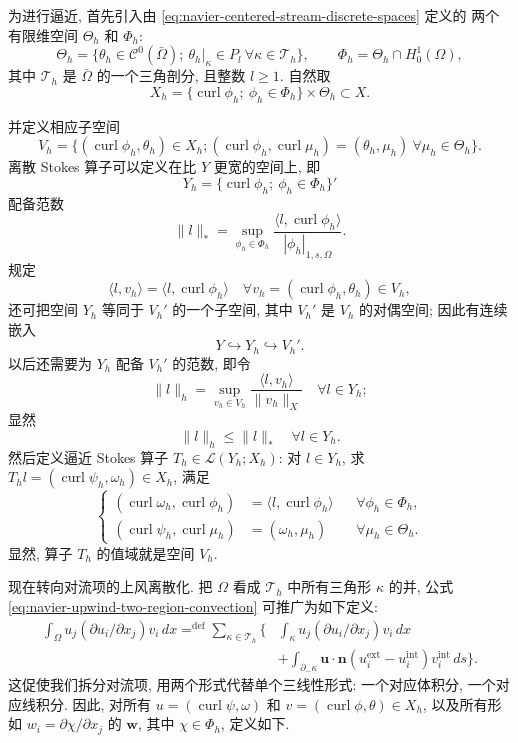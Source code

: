 为进行逼近, 首先引入由 \eqref{eq:navier-centered-stream-discrete-spaces} 定义的
两个有限维空间 $\Theta_h$ 和 $\Phi_h$:
\[
\Theta_h=\{\theta_h\in\mathcal C^0(\bar\Omega);
\ \theta_h|_\kappa\in P_l\ \forall\kappa\in\mathcal T_h\},
\qquad
\Phi_h=\Theta_h\cap H_0^1(\Omega),
\]
其中 $\mathcal T_h$ 是 $\bar\Omega$ 的一个三角剖分, 且整数 $l\geq1$. 自然取
\[
X_h=\{\operatorname{curl}\phi_h;\ \phi_h\in\Phi_h\}\times\Theta_h\subset X.
\]

并定义相应子空间
\begin{equation}\label{eq:navier-upwind-discrete-subspace}
V_h=\{(\operatorname{curl}\phi_h,\theta_h)\in X_h;
(\operatorname{curl}\phi_h,\operatorname{curl}\mu_h)
=(\theta_h,\mu_h)\ \forall\mu_h\in\Theta_h\}.
\end{equation}
离散 Stokes 算子可以定义在比 $Y$ 更宽的空间上, 即
\[
Y_h=\{\operatorname{curl}\phi_h;\ \phi_h\in\Phi_h\}'
\]
配备范数
\[
\|l\|_*=\sup_{\phi_h\in\Phi_h}
\frac{\langle l,\operatorname{curl}\phi_h\rangle}{|\phi_h|_{1,s,\Omega}}.
\]
规定
\[
\langle l,v_h\rangle=\langle l,\operatorname{curl}\phi_h\rangle
\quad\forall v_h=(\operatorname{curl}\phi_h,\theta_h)\in V_h,
\]
还可把空间 $Y_h$ 等同于 $V_h'$ 的一个子空间, 其中 $V_h'$ 是 $V_h$ 的对偶空间;
因此有连续嵌入
\[
Y\hookrightarrow Y_h\hookrightarrow V_h'.
\]
以后还需要为 $Y_h$ 配备 $V_h'$ 的范数, 即令
\[
\|l\|_h=\sup_{v_h\in V_h}\frac{\langle l,v_h\rangle}{\|v_h\|_X}
\quad\forall l\in Y_h;
\]
显然
\[
\|l\|_h\leq\|l\|_*
\quad\forall l\in Y_h.
\]
然后定义逼近 Stokes 算子 $T_h\in\mathcal L(Y_h;X_h)$: 对 $l\in Y_h$,
求 $T_hl=(\operatorname{curl}\psi_h,\omega_h)\in X_h$, 满足
\begin{equation}\label{eq:navier-upwind-discrete-stokes}
\left\{
\begin{aligned}
(\operatorname{curl}\omega_h,\operatorname{curl}\phi_h)
&=\langle l,\operatorname{curl}\phi_h\rangle
&&\forall\phi_h\in\Phi_h,\\
(\operatorname{curl}\psi_h,\operatorname{curl}\mu_h)
&=(\omega_h,\mu_h)
&&\forall\mu_h\in\Theta_h.
\end{aligned}
\right.
\end{equation}
显然, 算子 $T_h$ 的值域就是空间 $V_h$.

现在转向对流项的上风离散化. 把 $\Omega$ 看成 $\mathcal T_h$ 中所有三角形
$\kappa$ 的并, 公式 \eqref{eq:navier-upwind-two-region-convection} 可推广为如下定义:
\begin{equation}\label{eq:navier-upwind-mesh-convection}
\begin{aligned}
\int_\Omega u_j(\partial u_i/\partial x_j)v_i\,dx
\mathrel{\mathop{=}^{\mathrm{def}}}
\sum_{\kappa\in\mathcal T_h}\Bigg\{
&\int_\kappa u_j(\partial u_i/\partial x_j)v_i\,dx\\
&+\int_{\partial_-\kappa}
\boldsymbol u\cdot\boldsymbol n
(u_i^{\mathrm{ext}}-u_i^{\mathrm{int}})v_i^{\mathrm{int}}\,ds
\Bigg\}.
\end{aligned}
\end{equation}
这促使我们拆分对流项, 用两个形式代替单个三线性形式: 一个对应体积分, 一个对应线积分.
因此, 对所有 $u=(\operatorname{curl}\psi,\omega)$ 和
$v=(\operatorname{curl}\phi,\theta)\in X_h$, 以及所有形如
$w_i=\partial\chi/\partial x_j$ 的 $\boldsymbol w$, 其中 $\chi\in\Phi_h$, 定义如下.

